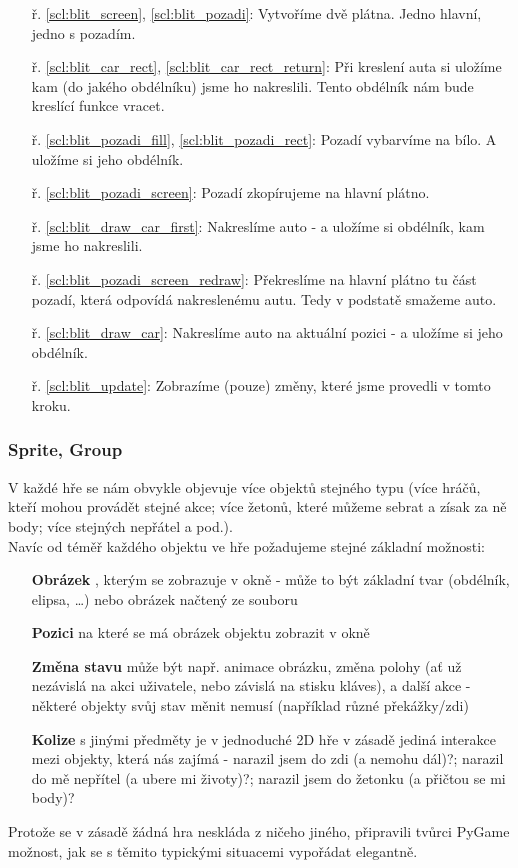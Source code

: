 \begin{minipage}[t]{.45\textwidth}
\begin{enumerate}
\item[ř. \ref{scl:blit_screen}, \ref{scl:blit_pozadi}:] Vytvoříme dvě plátna. Jedno hlavní, jedno s pozadím.
\item[ř. \ref{scl:blit_car_rect}, \ref{scl:blit_car_rect_return}:] Při kreslení auta si uložíme kam (do jakého obdélníku) jsme ho nakreslili. Tento obdélník nám bude kreslící funkce vracet.
\vspace{2cm}
\item[ř. \ref{scl:blit_pozadi_fill}, \ref{scl:blit_pozadi_rect}:] Pozadí vybarvíme na bílo. A uložíme si jeho obdélník.
\item[ř. \ref{scl:blit_pozadi_screen}:] Pozadí zkopírujeme na hlavní plátno.
\item[ř. \ref{scl:blit_draw_car_first}:] Nakreslíme auto - a uložíme si obdélník, kam jsme ho nakreslili.
\item[ř. \ref{scl:blit_pozadi_screen_redraw}:] Překreslíme na hlavní plátno tu část pozadí, která odpovídá nakreslenému autu. Tedy v podstatě smažeme auto.
\vspace{7cm}
\item[ř. \ref{scl:blit_draw_car}:] Nakreslíme auto na aktuální pozici - a uložíme si jeho obdélník.
\item[ř. \ref{scl:blit_update}:] Zobrazíme (pouze) změny, které jsme provedli v tomto kroku.
\end{enumerate}
\end{minipage}

\subsubsection{Sprite, Group}
V každé hře se nám obvykle objevuje více objektů stejného typu (více hráčů, kteří mohou provádět stejné akce; více žetonů, které můžeme sebrat a zísak za ně body; více stejných nepřátel a pod.).\\
Navíc od téměř každého objektu ve hře požadujeme stejné základní možnosti:
\begin{enumerate}
\item [\textbf{Obrázek}], kterým se zobrazuje v okně - může to být základní tvar (obdélník, elipsa, \dots) nebo obrázek načtený ze souboru
\item [\textbf{Pozici}] na které se má obrázek objektu zobrazit v okně
\item [\textbf{Změna stavu}] může být např. animace obrázku, změna polohy (ať už nezávislá na akci uživatele, nebo závislá na stisku kláves), a další akce - některé objekty svůj stav měnit nemusí (například různé překážky/zdi)
\item [\textbf{Kolize}] s jinými předměty je v jednoduché 2D hře v zásadě jediná interakce mezi objekty, která nás zajímá - narazil jsem do zdi (a nemohu dál)?; narazil do mě nepřítel (a ubere mi životy)?; narazil jsem do žetonku (a přičtou se mi body)?
\end{enumerate}
Protože se v zásadě žádná hra neskláda z ničeho jiného, připravili tvůrci PyGame možnost, jak se s těmito typickými situacemi vypořádat elegantně.

